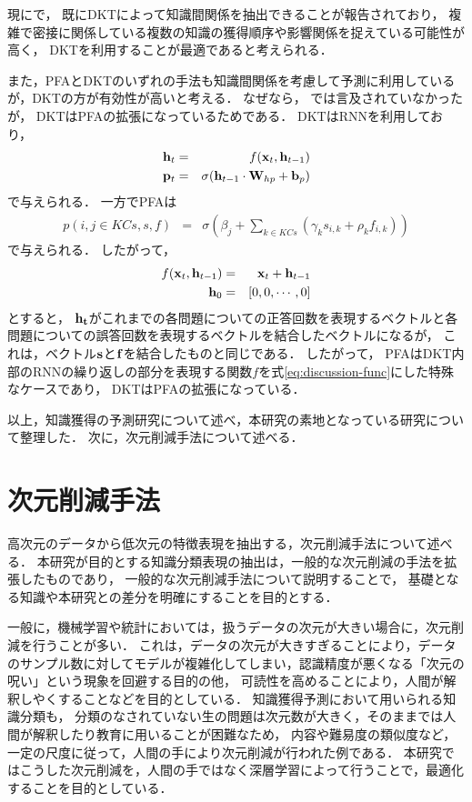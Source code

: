 現に\cite{piech2015deep}で，
既にDKTによって知識間関係を抽出できることが報告されており，
複雑で密接に関係している複数の知識の獲得順序や影響関係を捉えている可能性が高く，
DKTを利用することが最適であると考えられる．

また，PFAとDKTのいずれの手法も知識間関係を考慮して予測に利用しているが，DKTの方が有効性が高いと考える．
なぜなら，
\cite{piech2015deep}では言及されていなかったが，
DKTはPFAの拡張になっているためである．
DKTはRNNを利用しており，
\begin{eqnarray}
{\bf h}_t & = & f({\bf x}_t, {\bf h}_{t-1})\\
{\bf p}_t & = & \sigma({\bf h}_{t-1} \cdot {\bf W}_{hp} + {\bf b}_p)
\end{eqnarray}
で与えられる．
一方でPFAは
\begin{eqnarray}
	p(i, j \in KCs, s, f) & = & \sigma( \beta _j + \sum_{k \in KCs}(\gamma_k s_{i, k} + \rho _k f_{i, k}) )
\end{eqnarray}
で与えられる．
したがって，
\begin{eqnarray}
\label{eq:discussion-func}
	f({\bf x}_t, {\bf h}_{t-1}) &=& {\bf x}_t + {\bf h}_{t-1}\\
	{\bf h}_{0} & = & [0, 0, \cdots , 0]
\end{eqnarray}
とすると，
${\bf h_t}$がこれまでの各問題についての正答回数を表現するベクトルと各問題についての誤答回数を表現するベクトルを結合したベクトルになるが， 
これは，ベクトル${\bf s}$と${\bf f}$を結合したものと同じである．
したがって，
PFAはDKT内部のRNNの繰り返しの部分を表現する関数$f$を式\ref{eq:discussion-func}にした特殊なケースであり，
DKTはPFAの拡張になっている．

\vvspace
以上，知識獲得の予測研究について述べ，本研究の素地となっている研究について整理した．
次に，次元削減手法について述べる．


\section{次元削減手法}
高次元のデータから低次元の特徴表現を抽出する，次元削減手法について述べる．
本研究が目的とする知識分類表現の抽出は，一般的な次元削減の手法を拡張したものであり，
一般的な次元削減手法について説明することで，
基礎となる知識や本研究との差分を明確にすることを目的とする．


一般に，機械学習や統計においては，扱うデータの次元が大きい場合に，次元削減を行うことが多い．
これは，データの次元が大きすぎることにより，データのサンプル数に対してモデルが複雑化してしまい，認識精度が悪くなる「次元の呪い」\cite{bellman1957dynamic,friedman1997bias}という現象を回避する目的の他，
可読性を高めることにより，人間が解釈しやくすることなどを目的としている．
知識獲得予測において用いられる知識分類も，
分類のなされていない生の問題は次元数が大きく，そのままでは人間が解釈したり教育に用いることが困難なため，
内容や難易度の類似度など，一定の尺度に従って，人間の手により次元削減が行われた例である．
本研究ではこうした次元削減を，人間の手ではなく深層学習によって行うことで，最適化することを目的としている．


